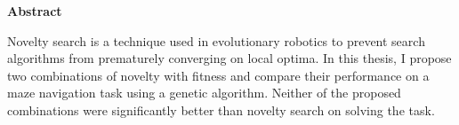 
\vspace*{3cm}

\begin{center}
	\textbf{Abstract}
\end{center}

{
	Novelty search is a technique used in evolutionary robotics to prevent search
	algorithms from prematurely converging on local optima.
	In this thesis, I propose two combinations of novelty with fitness and
	compare their performance on a maze navigation task using a genetic algorithm.
	Neither of the proposed combinations were significantly better than novelty search on
	solving the task.
}

\thispagestyle{empty}
\newpage